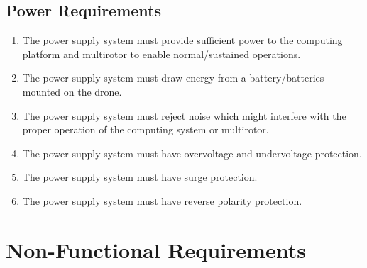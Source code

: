 \documentclass[10pt,letterpaper]{article}
\begin{document}
\subsection{Power Requirements}
\begin{enumerate}[label=F.PR.\arabic*, wide=1cm, widest=3cm, leftmargin=*, font=\bfseries, noitemsep,topsep=0pt, parsep=4pt, partopsep=0pt]
	\item The power supply system must provide sufficient power to the computing platform and multirotor to enable normal/sustained operations.
	\item The power supply system must draw energy from a battery/batteries mounted on the drone.
    \item The power supply system must reject noise which might interfere with the proper operation of the computing system or multirotor.
    \item The power supply system must have overvoltage and undervoltage protection.
    \item The power supply system must have surge protection.
    \item The power supply system must have reverse polarity protection.
\end{enumerate}

\section{Non-Functional Requirements}\label{section:nonfuncrec}
\end{document}
